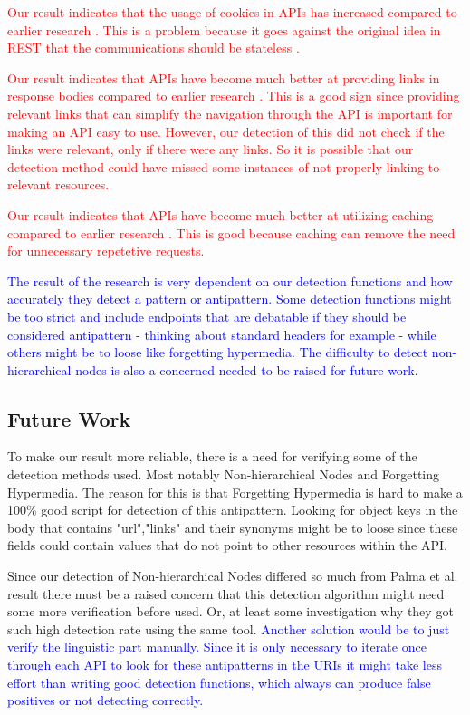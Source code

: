 \textcolor{red}{
Our result indicates that the usage of cookies in APIs has increased compared to earlier research \cite{design}. This is a problem because it goes against the original idea in REST that the communications should be stateless \cite{restdissertation}\cite{design}.
}

\textcolor{red}{
Our result indicates that APIs have become much better at providing links in response bodies compared to earlier research \cite{design}. This is a good sign since providing relevant links that can simplify the navigation through the API is important for making an API easy to use. However, our detection of this did not check if the links were relevant, only if there were any links. So it is possible that our detection method could have missed some instances of not properly linking to relevant resources.
}

\textcolor{red}{
Our result indicates that APIs have become much better at utilizing caching compared to earlier research \cite{design}. This is good because caching can remove the need for unnecessary repetetive requests. 
}


\textcolor{blue}{The result of the research is very dependent on our detection functions and how accurately they detect a pattern or antipattern. Some detection functions might be too strict and include endpoints that are debatable if they should be considered antipattern - thinking about standard headers for example - while others might be to loose like forgetting hypermedia. The difficulty to detect non-hierarchical nodes is also a concerned needed to be raised for future work.}

\subsection{Future Work}
\label{futureWork}

To make our result more reliable, there is a need for verifying some of the detection methods used. Most notably Non-hierarchical Nodes and Forgetting Hypermedia. The reason for this is that Forgetting Hypermedia is hard to make a 100\% good script for detection of this antipattern. Looking for object keys in the body that contains "url","links" and their synonyms might be to loose since these fields could contain values that do not point to other resources within the API. 

Since our detection of Non-hierarchical Nodes differed so much from Palma et al. \cite{linguistic} result there must be a raised concern that this detection algorithm might need some more verification before used. Or, at least some investigation why they got such high detection rate using the same tool. \textcolor{blue}{Another solution would be to just verify the linguistic part manually. Since it is only necessary to iterate once through each API to look for these antipatterns in the URIs it might take less effort than writing good detection functions, which always can produce false positives or not detecting correctly.}

